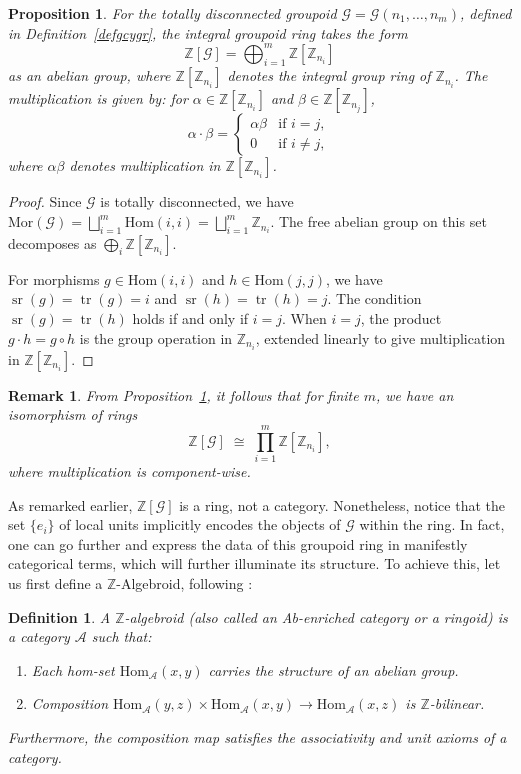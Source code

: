\documentclass[a4paper,12pt]{article}
\newtheorem{proposition}{Proposition}[section]
\newtheorem{definition}{Definition}[section]
\newtheorem{remark}{Remark}[section]
\newcommand{\Z}{\mathbb{Z}}
\newcommand{\calG}{\mathcal{G}}
\newcommand{\Hom}{\mathrm{Hom}}
\newcommand{\Mor}{\mathrm{Mor}}
\begin{document}
\begin{proposition}   
\label{prop-tdg1} 
For the totally disconnected groupoid $\calG = \calG(n_1, \ldots, n_m)$, defined in Definition~\ref{defgcygr},  the integral groupoid ring takes the form
\[
  \Z[\calG] = \bigoplus_{i=1}^{m} \Z[\Z_{n_i}]  
\]
as an abelian group, where $\Z[\Z_{n_i}]$ denotes the integral group
ring of $\Z_{n_i}$. The multiplication is given by: for
$\alpha \in \Z[\Z_{n_i}]$ and $\beta \in \Z[\Z_{n_j}]$,
\[
  \alpha \cdot \beta =
  \begin{cases}
    \alpha\beta & \text{if } i = j, \\
    0           & \text{if } i \neq j,
  \end{cases}
\]
where $\alpha\beta$ denotes multiplication in $\Z[\Z_{n_i}]$.
\end{proposition}
\begin{proof}
Since $\calG$ is totally disconnected, we have
$\Mor(\calG) = \bigsqcup_{i=1}^{m} \Hom(i,i) = \bigsqcup_{i=1}^{m} \Z_{n_i}$.
The free abelian group on this set decomposes as
$\bigoplus_i \Z[\Z_{n_i}]$.

For morphisms $g \in \Hom(i,i)$ and $h \in \Hom(j,j)$, we have
$\operatorname{sr}(g) = \operatorname{tr}(g) = i$ and $\operatorname{sr}(h) = \operatorname{tr}(h) = j$. The condition $\operatorname{sr}(g) = \operatorname{tr}(h)$
holds if and only if $i = j$. When $i = j$, the product
$g \cdot h = g \circ h$ is the group operation in $\Z_{n_i}$, extended
linearly to give multiplication in $\Z[\Z_{n_i}]$.
\end{proof}


\begin{remark}
From Proposition~\ref{prop-tdg1}, it follows that for finite $m$, we have an isomorphism of rings
\[
  \Z[\calG] \;\cong\; \prod_{i=1}^{m} \Z[\Z_{n_i}],
\]
where multiplication is component-wise. 
\end{remark}


As remarked earlier,  $\Z[\calG]$ is a ring, not a category. Nonetheless, notice that the set $\{ e_i \}$ of local units implicitly encodes the objects of $\calG$ within the ring. In fact, one can go further and express the data of this groupoid ring in manifestly categorical terms, which will further illuminate its structure.  
To achieve this, let us first define a $\Z$-Algebroid, following \cite{mitchell1985, Kelly1982, mitchener2014, avi2026, nlab:ab-enriched_category}:
\begin{definition}  
A \emph{$\Z$-algebroid} (also called an \emph{Ab-enriched category} or
a \emph{ringoid}) is a category $\mathcal{A}$ such that:
\begin{enumerate}  
  \item Each hom-set $\Hom_\mathcal{A}(x, y)$ carries the structure of an
        abelian group.
  \item Composition
        $\Hom_\mathcal{A}(y,z) \times \Hom_\mathcal{A}(x,y) \to \Hom_\mathcal{A}(x,z)$
        is $\Z$-bilinear.  
\end{enumerate}
Furthermore, the composition map satisfies the associativity and unit axioms of a category. 
\end{definition}
\end{document}
